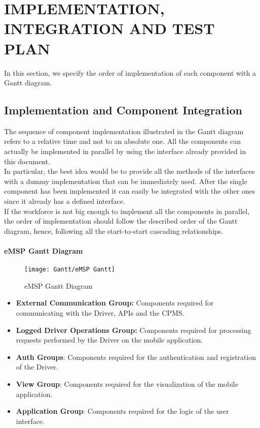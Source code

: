 \chapter{IMPLEMENTATION, INTEGRATION AND TEST PLAN}
\label{ch:IV}%
In this section, we specify the order of implementation of each component with a Gantt diagram.
\section{Implementation and Component Integration}
\label{sec:componentIntegration}%
The sequence of component implementation illustrated in the Gantt diagram refers to a relative time and not to an absolute one. All the components can actually be implemented in parallel by using the interface already provided in this document. \\
In particular, the best idea would be to provide all the methods of the interfaces with a dummy implementation that can be immediately used. After the single component has been implemented it can easily be integrated with the other ones since it already has a defined interface.\\
If the workforce is not big enough to implement all the components in parallel, the order of implementation should follow the described order of the Gantt diagram, hence, following all the start-to-start cascading relationships. 
\subsubsection{eMSP Gantt Diagram}
\begin{figure}[H]
    \begin{center}
    \texttt{[image: Gantt/eMSP Gantt]}
    \caption{eMSP Gantt Diagram}
    \label{fig:eMSPGantt}
    \end{center}
\end{figure}
\begin{itemize}
    \item \textbf{External Communication Group:} Components required for communicating with the Driver, APIs and the CPMS.
    \item \textbf{Logged Driver Operations Group:} Components required for processing requests performed by the Driver on the mobile application.
    \item \textbf{Auth Groups}: Components required for the authentication and registration of the Driver.
    \item \textbf{View Group}: Components required for the visualization of the mobile application.
    \item \textbf{Application Group}: Components required for the logic of the user interface.
\end{itemize}
